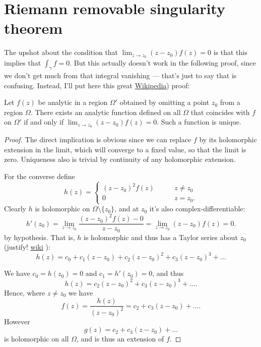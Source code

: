 \section{Riemann removable singularity theorem}
\label{section-removable-singularity}

\noindent
The upshot about the condition that
$\lim_{z \to z_0} (z-z_0)f(z)=0$ is that this implies
that $\int_\gamma f=0$. But this actually doesn't
work in the following proof, since we don't get much from that
integral vanishing --- that's just to say that
\cite[Chapter 4, Theorem 7]{Ahlfors} is confusing.
Instead, I'll put here this great 
\href{https://en.wikipedia.org/wiki/Removable_singularity}{Wikipedia})
proof:

\begin{theorem}
\label{theorem-removable-singularity}
Let $f(z)$ be analytic in a region $\Omega'$ obtained by omitting a point $z_0$
from a region $\Omega$. There exists an analytic function  defined on all 
$\Omega$ that coincides with $f$ on $\Omega'$ if and only if 
$\lim_{z \to z_0} (z-z_0)f(z)=0$. Such a function is unique.
\end{theorem}

\begin{proof}
The direct implication is obvious since we can replace $f$ by
its holomorphic extension in the limit, which will converge to a fixed
value, so that the limit is zero. Uniqueness also is trivial
by continuity of any holomorphic extension.

For the converse define
$$
h(z)=\begin{cases}
(z-z_0)^2f(z)\qquad &z \neq z_0 \\
0\qquad &z=z_0.
\end{cases}
$$
Clearly $h$ is holomorphic on $\Omega\setminus\{z_0\}$,
and at $z_0$ it's also complex-differentiable:
$$
h'(z_0)=\lim_{z \to z_0} \frac{(z-z_0)^2f(z)-0}{z-z_0}
=\lim_{z\to z_0}(z-z_0)f(z)=0.
$$
by hypothesis. That is, $h$ is holomorphic
and thus has a Taylor series about $z_0$ (justify!
\href{https://en.wikipedia.org/wiki/Analyticity_of_holomorphic_functions}{wiki}
):
$$
h(z)=c_0+c_1(z-z_0)+c_2(z-z_0)^2+c_3(z-z_0)^3+\ldots
$$

We have $c_0=h(z_0)=0$ and $c_1=h'(z_0)=0$, and thus
$$
h(z)=c_2(z-z_0)^2+c_3(z-z_0)^3+\ldots.
$$
Hence, where $z\neq z_0$ we have
$$
f(z)=\frac{h(z)}{(z-z_0)^2}=c_2+c_3(z-z_0)+\ldots.
$$
However
$$
g(z)=c_2+c_3(z-z_0)+\ldots
$$
is holomorphic on all $\Omega$, and is thus an extension of $f$.
\end{proof}

